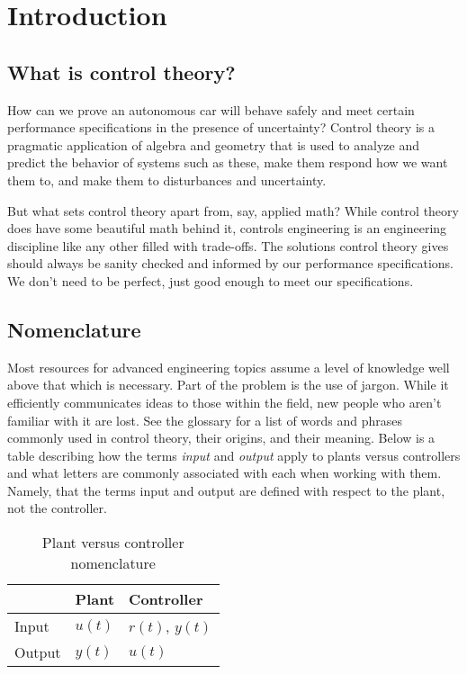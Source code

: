 
\chapter{Introduction}

\section{What is control theory?}

How can we prove an autonomous car will behave safely and meet certain
performance specifications in the presence of uncertainty? Control theory is a
pragmatic application of algebra and geometry that is used to analyze and
predict the behavior of \glspl{system} such as these, make them respond how we
want them to, and make them  to \glspl{disturbance}
and uncertainty.

But what sets control theory apart from, say, applied math? While control theory
does have some beautiful math behind it, controls engineering is an engineering
discipline like any other filled with trade-offs. The solutions control theory
gives should always be sanity checked and informed by our performance
specifications. We don't need to be perfect, just good enough to meet our
specifications.

\section{Nomenclature}

Most resources for advanced engineering topics assume a level of knowledge well
above that which is necessary. Part of the problem is the use of jargon. While
it efficiently communicates ideas to those within the field, new people who
aren't familiar with it are lost. See the glossary for a list of words and
phrases commonly used in control theory, their origins, and their meaning. Below
is a table describing how the terms \textit{input} and \textit{output} apply to
\glspl{plant} versus \glspl{controller} and what letters are commonly associated
with each when working with them. Namely, that the terms input and output are
defined with respect to the \gls{plant}, not the \gls{controller}.

\begin{table}
  \renewcommand{\arraystretch}{1.3}
  \centering
  \begin{tabular}{|l|ll|}
    \hline
    \rowcolor{headingbg}
    & \textbf{Plant} & \textbf{Controller} \\
    \hline
    Input & $u(t)$ & $r(t)$, $y(t)$ \\
    Output & $y(t)$ & $u(t)$ \\
    \hline
  \end{tabular}
  \caption{Plant versus controller nomenclature}
  \label{tab:plant_v_controller}
\end{table}
